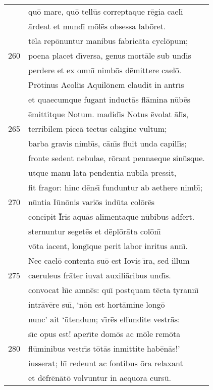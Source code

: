 \documentclass[paper=6in:9in,pagesize=pdftex,
               headinclude=on,footinclude=on,12pt]{scrbook}
\begin{document}
\begin{longtable}[p]{ r l }
 & qu\=o mare, qu\=o tell\=us correptaque r\=egia cael\={\i}\\ 
 & \=ardeat et mund\={\i} m\=ol\=es obsessa lab\=oret.\\ 
 & t\=ela rep\=onuntur manibus fabric\=ata cycl\=opum;\\ 
260 & poena placet d\={\i}versa, genus mort\=ale sub und\={\i}s\\ 
 & perdere et ex omn\={\i} nimb\=os d\=emittere cael\=o.\\ 
 & \indent Pr\=otinus Aeoli\={\i}s Aquil\=onem claudit in antr\={\i}s\\ 
 & et quaecumque fugant induct\=as fl\=amina n\=ub\=es\\ 
 & \=emittitque Notum. madid\={\i}s Notus \=evolat \=al\={\i}s,\\ 
265 & terribilem pice\=a t\=ectus c\=al\={\i}gine vultum;\\ 
 & barba gravis nimb\={\i}s, c\=an\={\i}s fluit unda capill\={\i}s;\\ 
 & fronte sedent nebulae, r\=orant pennaeque sin\=usque.\\ 
 & utque man\=u l\=at\=a pendentia n\=ubila pressit,\\ 
 & fit fragor: hinc d\=ens\={\i} funduntur ab aethere nimb\={\i};\\ 
270 & n\=untia I\=un\=onis vari\=os ind\=uta col\=or\=es\\ 
 & concipit \=Iris aqu\=as alimentaque n\=ubibus adfert.\\ 
 & sternuntur seget\=es et d\=epl\=or\=ata col\=on\={\i}\\ 
 & v\=ota iacent, long\={\i}que perit labor inritus ann\={\i}.\\ 
 & \indent Nec cael\=o contenta su\=o est Iovis \={\i}ra, sed illum\\ 
275 & caeruleus fr\=ater iuvat auxili\=aribus und\={\i}s.\\ 
 & convocat h\={\i}c amn\=es: qu\={\i} postquam t\=ecta tyrann\={\i}\\ 
 & intr\=av\=ere su\={\i}, `n\=on est hort\=amine long\=o\\ 
 & nunc' ait `\=utendum; v\={\i}r\=es effundite vestr\=as:\\ 
 & s\={\i}c opus est! aper\={\i}te dom\=os ac m\=ole rem\=ota\\ 
280 & fl\=uminibus vestr\={\i}s t\=ot\=as inmittite hab\=en\=as!'\\ 
 & iusserat; h\={\i} redeunt ac fontibus \=ora relaxant\\ 
 & et d\=efr\=en\=at\=o volvuntur in aequora curs\=u.\\ 

\end{longtable}
\end{document}
